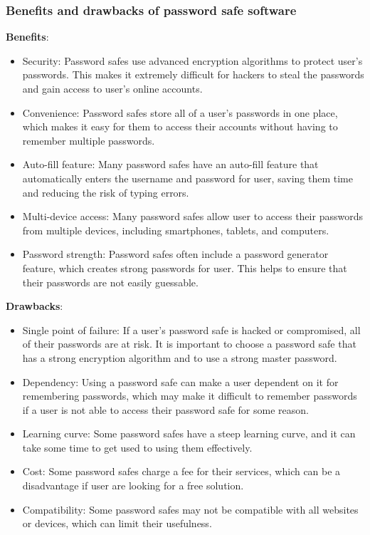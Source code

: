 \documentclass[conference]{IEEEtran}
\begin{document}
\subsubsection{Benefits and drawbacks of password safe software}\cite{b8}
\textbf{Benefits}:
\begin{itemize}
\item Security: Password safes use advanced encryption algorithms to protect user's passwords. This makes it extremely difficult for hackers to steal the passwords and gain access to user's online accounts.
\item Convenience: Password safes store all of a user's passwords in one place, which makes it easy for them to access their accounts without having to remember multiple passwords.
\item Auto-fill feature: Many password safes have an auto-fill feature that automatically enters the username and password for user, saving them time and reducing the risk of typing errors.
\item Multi-device access: Many password safes allow user to access their passwords from multiple devices, including smartphones, tablets, and computers.
\item Password strength: Password safes often include a password generator feature, which creates strong passwords for user. This helps to ensure that their passwords are not easily guessable.
\end{itemize}
\textbf{Drawbacks}:
\begin{itemize}
\item Single point of failure: If a user's password safe is hacked or compromised, all of their passwords are at risk. It is important to choose a password safe that has a strong encryption algorithm and to use a strong master password.
\item Dependency: Using a password safe can make a user dependent on it for remembering passwords, which may make it difficult to remember passwords if a user is not able to access their password safe for some reason.
\item Learning curve: Some password safes have a steep learning curve, and it can take some time to get used to using them effectively.
\item Cost: Some password safes charge a fee for their services, which can be a disadvantage if user are looking for a free solution.
\item Compatibility: Some password safes may not be compatible with all websites or devices, which can limit their usefulness.
\end{itemize}
\end{document}
